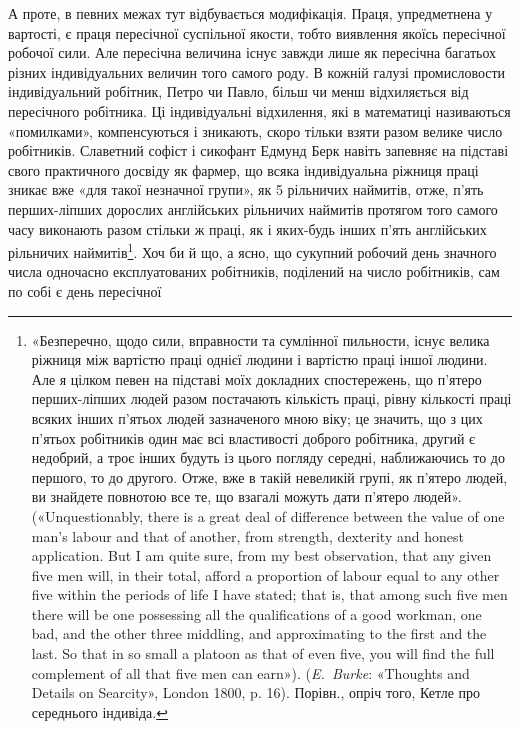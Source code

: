 А проте, в певних межах тут відбувається модифікація. Праця,
упредметнена у вартості, є праця пересічної суспільної якости,
тобто виявлення якоїсь пересічної робочої сили. Але пересічна
величина існує завжди лише як пересічна багатьох різних індивідуальних
величин того самого роду. В кожній галузі промисловости
індивідуальний робітник, Петро чи Павло, більш чи менш
відхиляється від пересічного робітника. Ці індивідуальні відхилення,
які в математиці називаються «помилками», компенсуються
і зникають, скоро тільки взяти разом велике число робітників.
Славетний софіст і сикофант Едмунд Берк навіть запевняє
на підставі свого практичного досвіду як фармер, що всяка індивідуальна
ріжниця праці зникає вже «для такої незначної групи»,
як 5 рільничих наймитів, отже, п’ять перших-ліпших дорослих
англійських рільничих наймитів протягом того самого часу виконають
разом стільки ж праці, як і яких-будь інших п’ять англійських
рільничих наймитів\footnote{
«Безперечно, щодо сили, вправности та сумлінної пильности, існує
велика ріжниця між вартістю праці однієї людини і вартістю праці іншої
людини. Але я цілком певен на підставі моїх докладних спостережень, що
п’ятеро перших-ліпших людей разом постачають кількість праці, рівну
кількості праці всяких інших п'ятьох людей зазначеного мною віку; це
значить, що з цих п’ятьох робітників один має всі властивості доброго
робітника, другий є недобрий, а троє інших будуть із цього погляду середні,
наближаючись то до першого, то до другого. Отже, вже в такій
невеликій групі, як п’ятеро людей, ви знайдете повнотою все те, що взагалі
можуть дати п'ятеро людей». («Unquestionably, there is a great deal
of difference between the value of one man’s labour and that of another,
from strength, dexterity and honest application. But I am quite sure, from
my best observation, that any given five men will, in their total, afford a
proportion of labour equal to any other five within the periods of life I have
stated; that is, that among such five men there will be one possessing all
the qualifications of a good workman, one bad, and the other three middling,
and approximating to the first and the last. So that in so small a platoon
as that of even five, you will find the full complement of all that five men
can earn»). (\emph{E.~Burke}: «Thoughts and Details on Searcity», London
1800, p. 16). Порівн., опріч того, Кетле про середнього індивіда.
}. Хоч би й що, а ясно, що сукупний
робочий день значного числа одночасно експлуатованих робітників,
поділений на число робітників, сам по собі є день пересічної
